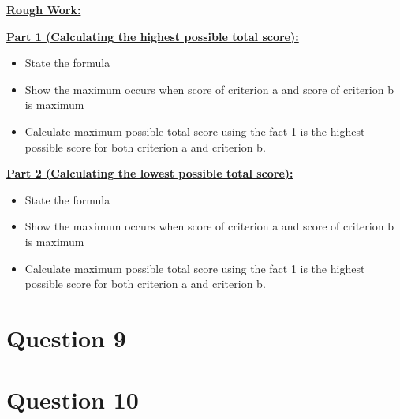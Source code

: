 \documentclass[12pt]{article}
\begin{document}
\begin{mdframed}
    \underline{\textbf{Rough Work:}}

    \bigskip

    \underline{\textbf{Part 1 (Calculating the highest possible total score):}}

    \bigskip

    \begin{itemize}
        \item State the formula
        \item Show the maximum occurs when score of criterion a and score of criterion b is maximum
        \item Calculate maximum possible total score using the fact 1 is the highest possible score
        for both criterion a and criterion b.
    \end{itemize}

    \bigskip

    \underline{\textbf{Part 2 (Calculating the lowest possible total score):}}

    \bigskip

    \begin{itemize}
        \item State the formula
        \item Show the maximum occurs when score of criterion a and score of criterion b is maximum
        \item Calculate maximum possible total score using the fact 1 is the highest possible score
        for both criterion a and criterion b.
    \end{itemize}
\end{mdframed}

\section*{Question 9}

\section*{Question 10}
\end{document}
